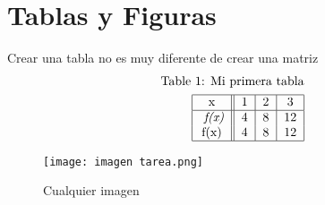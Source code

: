 \documentclass{article}
\begin{document}
\section{Tablas y Figuras}
Crear una tabla no es muy diferente de crear una matriz
\begin{align*}
    \text{Table 1: Mi primera tabla}\\
    \begin{tabular}{|c||c|c|c|}
      \hline 
        x & 1 & 2 & 3 \\
        \hline
       \textit{ f(x)} & 4 & 8 & 12 \\
        f(x) & 4 & 8 & 12 \\
    \hline
    \end{tabular}
\end{align*} 
\begin{figure}[H]
    \centering
    \texttt{[image: imagen tarea.png]}
    \caption{Cualquier imagen}
    \label{fig:enter-label}
\end{figure}
\end{document}
